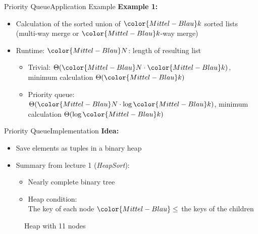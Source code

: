 \begin{frame}{Priority Queue}{Application Example}
  \textbf{Example 1:}
  \begin{itemize}
    \item
      Calculation of the sorted union of ${\color{Mittel-Blau}k}$ sorted lists\\
      (multi-way merge or ${\color{Mittel-Blau}k}$-way merge)
    \item
      Runtime:
      ${\color{Mittel-Blau}N}$: length of resulting list
      \begin{itemize}
        \item
          Trivial:
          \begin{math}
            \Theta({\color{Mittel-Blau}N} \cdot {\color{Mittel-Blau}k})
          \end{math},
          minimum calculation $\Theta({\color{Mittel-Blau}k})$
        \item
          Priority queue:
          \begin{math}
            \Theta({\color{Mittel-Blau}N} \cdot \log {\color{Mittel-Blau}k})
          \end{math},
          minimum calculation  $\Theta(\log {\color{Mittel-Blau}k})$
      \end{itemize}
    \end{itemize}
\end{frame}


\begin{frame}{Priority Queue}{Implementation}
  \textbf{Idea:}
  \begin{itemize}
    \item
      Save elements as tuples in a binary heap
    \item
      Summary from lecture 1 (\textit{HeapSort}):
    \begin{itemize}
      \item
        Nearly complete binary tree
      \item
        {\color{Mittel-Blau}Heap condition}:\\
        The key of each node ${\color{Mittel-Blau}\leq}$ the keys of the
        children\\
    \end{itemize}
  \end{itemize}
  \vspace{-0.5em}
  \begin{figure}[!h]
    \begin{adjustbox}{height=0.3\textwidth}
    \end{adjustbox}
    \vspace{-0.75em}
    \caption{Heap with 11 nodes}%
    \label{fig:priority_queue:impl_heap}%
  \end{figure}
\end{frame}

